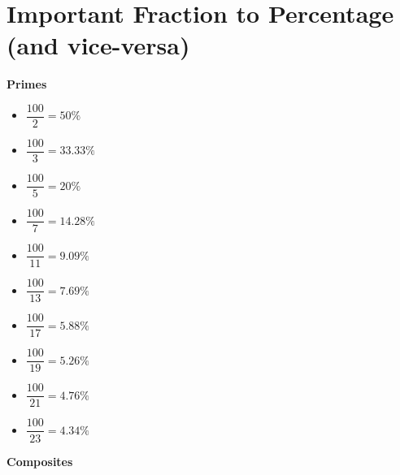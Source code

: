 \section{Important Fraction to Percentage (and vice-versa)}

\begin{multicols}{3}

\textbf{Primes}

\begin{itemize}
    \item $\dfrac{100}{2} = 50\%$
    \item $\dfrac{100}{3} = 33.33\%$
    \item $\dfrac{100}{5} = 20\%$
    \item $\dfrac{100}{7} = 14.28\%$
    \item $\dfrac{100}{11} = 9.09\%$
    \item $\dfrac{100}{13} = 7.69\%$
    \item $\dfrac{100}{17} = 5.88\%$
    \item $\dfrac{100}{19} = 5.26\%$
    \item $\dfrac{100}{21} = 4.76\%$
    \item $\dfrac{100}{23} = 4.34\%$
\end{itemize}

\columnbreak

\textbf{Composites}


\end{multicols}
